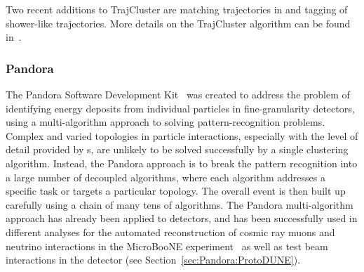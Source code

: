 Two recent additions to TrajCluster are matching trajectories in \threed and tagging of shower-like trajectories. More details on the TrajCluster algorithm can be found in~\cite{ref:trajcluster}.



\subsubsection{Pandora}\label{sec:Pandora}

The Pandora Software Development Kit~\cite{Marshall:2015rfa} was created to address the problem of identifying energy deposits from individual particles in fine-granularity detectors, using a multi-algorithm approach to solving pattern-recognition problems. Complex and varied topologies in particle interactions, especially with the level of detail provided by \lartpc{}s, are unlikely to be solved successfully by a single clustering algorithm. Instead, the Pandora approach is to break the pattern recognition into a large number of decoupled algorithms, where each algorithm addresses a specific task or targets a particular topology. The overall event is then built up carefully using a chain of many tens of algorithms. The Pandora multi-algorithm approach has already been applied to \lartpc{} detectors, and has been successfully used in different analyses for the automated reconstruction of cosmic ray muons and neutrino interactions in the MicroBooNE experiment~\cite{Acciarri:2017hat} as well as test beam interactions in the  detector (see Section~\ref{sec:Pandora:ProtoDUNE}).




